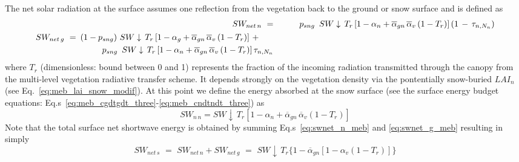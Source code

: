 %
The net solar radiation at the surface assumes one reflection from the
vegetation back to the ground or snow surface and is defined as
%
\begin{align}
\label{eq:swnet_n_meb}
SW_{net\,n} \,\,=&\,\, 
\hskip.38in p_{sng}\,\,\, SW\downarrow \, T_r 
\left[
1 - \alpha_n + {\overline\alpha}_{gn}\, 
{\overline\alpha}_v \left(1-T_r\right)
\right]
\left(1 \,-\, \tau_{n,N_n}\right)
\\
\label{eq:swnet_g_meb}
\begin{split}
SW_{net\,g} \,\,=&\,\, \left(1-p_{sng}\right) \, SW\downarrow \, T_r 
\left[
1 - \alpha_g + {\overline\alpha}_{gn}\, 
{\overline\alpha}_v \left(1-T_r\right)
\right] \,+\,
\\
& 
\,\, 
\hskip.38in p_{sng}\,\,\, SW\downarrow \, T_r 
\left[
1 - \alpha_n + {\overline\alpha}_{gn}\, 
{\overline\alpha}_v \left(1-T_r\right)
\right] \tau_{n,N_n}
\end{split}
%
\end{align}
%
where 
$T_r$ (dimensionless: bound between 0 and 1)
represents the fraction of the incoming radiation transmitted through the
canopy from the multi-level vegetation radiative transfer
scheme. It depends strongly on the vegetation density via the
pontentially snow-buried $LAI_n$ (see
Eq.~\ref{eq:meb_lai_snow_modif}).
%
At this point we define the energy absorbed at the snow surface 
(see the surface energy budget equations:
Eq.s~\ref{eq:meb_cgdtgdt_three}-\ref{eq:meb_cndtndt_three})
as
%
\begin{equation}
\label{eq:meb_sw_snow_sfc_abs}
SW_{n\,n}= SW\downarrow \, T_r \left[
1 - \alpha_n + {\overline\alpha}_{gn}\, 
{\overline\alpha}_v \left(1-T_r\right)
\right] 
\end{equation}
%
Note that the total surface net shortwave energy is obtained by
summing Eq.s~\ref{eq:swnet_n_meb} and \ref{eq:swnet_g_meb} resulting in simply
%
\begin{equation}
\label{eq:swnet_sfc_meb}
SW_{net\,s} 
\,\,=\,\, 
SW_{net\,n} + SW_{net\,g}
\,\,=\,\, 
SW\downarrow \, T_r 
\big\lbrace
1 - {\overline\alpha}_{gn} \left[
1 - \alpha_v \left(1-T_r\right)\right]
\big\rbrace 
%
\end{equation}


